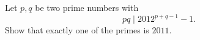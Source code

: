 Let $p,q$ be two prime numbers with 
$$pq \mid 2012^{p+q-1} -1.$$
Show that exactly one of the primes is $2011$.